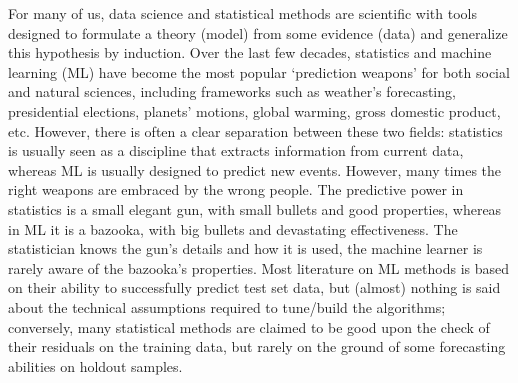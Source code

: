 \documentclass{statsoc}
\begin{document}
For many of us, data science and statistical methods 
are scientific with tools designed to formulate a theory (model) from some evidence (data) and generalize this hypothesis by induction.
Over the last few decades, statistics and machine learning (ML) have become the most popular `prediction weapons' for both social and natural sciences, including frameworks such as weather's forecasting, presidential elections, planets' motions, global warming, gross domestic product, etc. However, there is often a clear separation between these two fields: statistics is usually seen as a discipline that extracts information from  current data, whereas ML is usually designed to predict new events.  However, many times the right weapons are embraced by the wrong people. The predictive power in statistics is a small elegant 
gun, with small bullets and good properties, whereas in ML it is a bazooka, with  big bullets and devastating effectiveness. The statistician knows the gun's details and how it is used, the machine learner is rarely aware of the bazooka's properties. Most literature on ML methods \citep{breiman2001statistical} is based on their ability to successfully predict test set 
data, but (almost) nothing is said about the technical assumptions required to tune/build the algorithms; conversely, many statistical methods are claimed to be good upon the check of 
their residuals on the training data, but rarely on the ground of some forecasting abilities on holdout samples.
 
\end{document}
